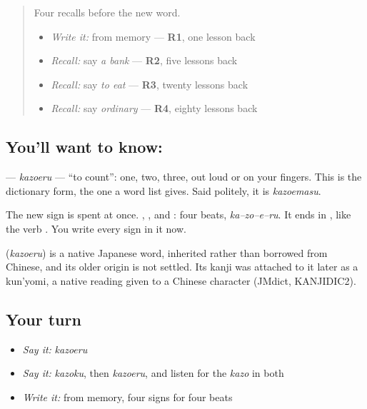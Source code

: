\label{lesson:JA-C136-kazoeru}



\begin{quote}
Four recalls before the new word.

\begin{itemize}
\raggedright
  \item \emph{Write it:} \textbf{} from memory — \textbf{R1}, one lesson back
  \item \emph{Recall:} say \emph{a bank} — \textbf{R2}, five lessons back
  \item \emph{Recall:} say \emph{to eat} — \textbf{R3}, twenty lessons back
  \item \emph{Recall:} say \emph{ordinary} — \textbf{R4}, eighty lessons back
\end{itemize}
\end{quote}

\subsection*{You'll want to know: }
\textbf{} — \emph{kazoeru} — \textquotedblleft{}to count\textquotedblright{}: one, two, three, out loud or on your fingers. This is the dictionary form, the one a word list gives. Said politely, it is \emph{kazoemasu}.

The new sign is spent at once. \textbf{}, \textbf{}, \textbf{} and \textbf{}: four beats, \emph{ka–zo–e–ru}. It ends in \textbf{}, like the verb \textbf{}. You write every sign in it now.

\begin{cousinweb}
\textbf{} (\emph{kazoeru}) is a native Japanese word, inherited rather than borrowed from Chinese, and its older origin is not settled. Its kanji was attached to it later as a kun'yomi, a native reading given to a Chinese character (JMdict, KANJIDIC2).
\end{cousinweb}

\subsection*{Your turn}
\begin{itemize}
\raggedright
  \item \emph{Say it:} \emph{kazoeru}
  \item \emph{Say it:} \emph{kazoku}, then \emph{kazoeru}, and listen for the \emph{kazo} in both
  \item \emph{Write it:} \textbf{} from memory, four signs for four beats
\end{itemize}

